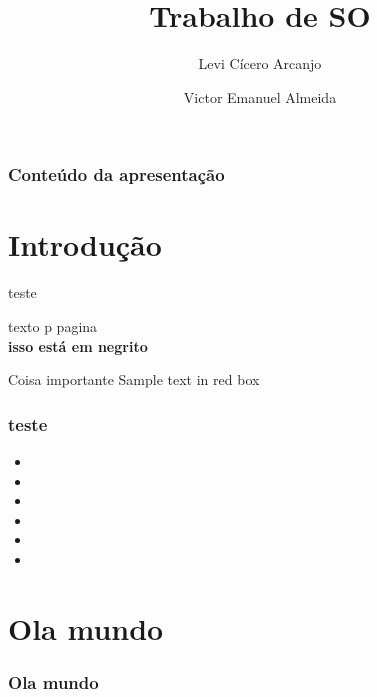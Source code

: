 \documentclass{beamer}
\author[Levi, Victor]{Levi Cícero Arcanjo  \and Victor Emanuel Almeida}
\title{Trabalho de SO}
\begin{document}
	\frame{\titlepage}
	\begin{frame}
		\frametitle{Conteúdo da apresentação}
		\tableofcontents
	\end{frame}
	\section{Introdução}

\begin{frame}
	teste
	
\end{frame}

	\begin{frame}
		texto p pagina \thepage\\
		\textbf{isso está em negrito}

		\begin{alertblock}{Coisa importante}
			Sample text in red box
		\end{alertblock}
	\end{frame}

	\begin{frame}
		\frametitle{teste}
		\begin{itemize}
			\item 
			\item 
			\item 
			\item 
			\item 
			\item 
		\end{itemize}
	\end{frame}
	\section{Ola mundo}
	\begin{frame}
		\frametitle{Ola mundo}
	\end{frame}
\end{document}

